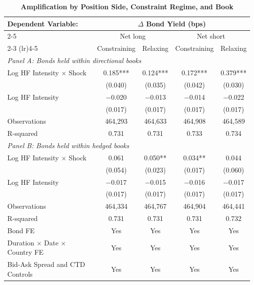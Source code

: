 \documentclass[english, 11pt, oneside]{article}
\begin{document}
\begin{table}[h!]
\centering
\caption{\textbf{Amplification by Position Side, Constraint Regime, and Book}}
\footnotesize
\setlength{\tabcolsep}{7pt}
\renewcommand{\arraystretch}{1.1}
\begin{tabular}{l c c c c}
\toprule
\textbf{Dependent Variable:} & \multicolumn{4}{c}{\textbf{$\Delta$ Bond Yield (bps)}} \\
\cmidrule(lr){2-5}
 & \multicolumn{2}{c}{Net long} & \multicolumn{2}{c}{Net short} \\
\cmidrule(lr){2-3} \cmidrule(lr){4-5}
 & Constraining & Relaxing & Constraining & Relaxing \\
\midrule
\multicolumn{5}{l}{\textit{Panel A: Bonds held within directional books}} \\
\addlinespace
Log HF Intensity $\times$ Shock & 0.185*** & 0.124*** & 0.172*** & 0.379*** \\
 & (0.040) & (0.035) & (0.042) & (0.030) \\
Log HF Intensity & $-$0.020 & $-$0.013 & $-$0.014 & $-$0.022 \\
 & (0.017) & (0.017) & (0.017) & (0.017) \\
Observations & 464,293 & 464,633 & 464,908 & 464,589 \\
R-squared & 0.731 & 0.731 & 0.733 & 0.734 \\
\midrule
\multicolumn{5}{l}{\textit{Panel B: Bonds held within hedged books}} \\
\addlinespace
Log HF Intensity $\times$ Shock & 0.061 & 0.050** & 0.034** & 0.044 \\
 & (0.054) & (0.023) & (0.017) & (0.060) \\
Log HF Intensity & $-$0.017 & $-$0.015 & $-$0.016 & $-$0.017 \\
 & (0.017) & (0.017) & (0.017) & (0.017) \\
Observations & 464,334 & 464,767 & 464,904 & 464,441 \\
R-squared & 0.731 & 0.731 & 0.731 & 0.732 \\
\midrule
Bond FE & Yes & Yes & Yes & Yes \\
Duration $\times$ Date $\times$ Country FE & Yes & Yes & Yes & Yes \\
Bid-Ask Spread and CTD Controls & Yes & Yes & Yes & Yes \\
\bottomrule
\end{tabular}
\label{tab:side_book}

\end{table}
\end{document}
